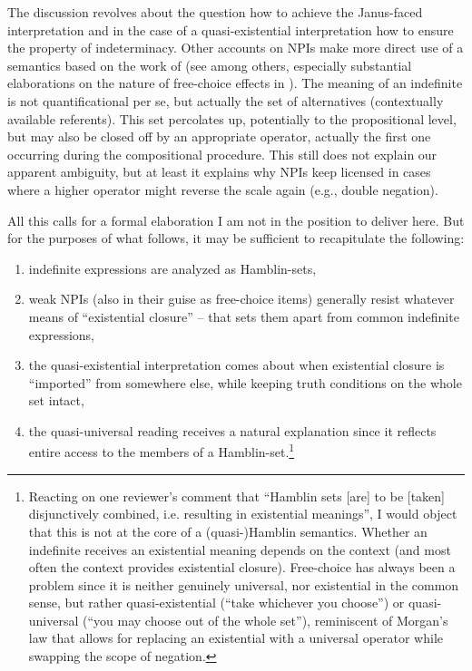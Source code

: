 \documentclass[output=paper,colorlinks,citecolor=brown,
]{langscibook}
\begin{document}
The discussion revolves about the question how to achieve the Janus-faced interpretation and in the case of a
quasi-existential interpretation how to ensure the property of indeterminacy. Other accounts on NPIs make more direct use
of a semantics based on the work of \citet{hamblin1973}
(see \citealt{ramchand1997,kratzershimo2002,kratzer2005,novelromero2009} among others, especially substantial elaborations
on the nature of free-choice effects in \citealt{fox2007,chierchia2013}). The meaning of an indefinite is
not quantificational per se, but actually the set of alternatives (contextually available referents). This set percolates up,
potentially to the propositional level, but may also be closed off by an appropriate operator, actually the first one
occurring during the compositional procedure. This still does not explain our apparent ambiguity, but at least it
explains why NPIs keep licensed in cases where a higher operator might reverse the scale again (e.g., double negation).

All this calls for a formal elaboration I am not in the position to deliver here. But for the purposes of what
follows, it may be sufficient to recapitulate the following: 

\begin{enumerate}[label=\roman*.]
\item indefinite expressions are analyzed as Hamblin-sets,
\item weak NPIs (also in their guise as free-choice items) generally resist whatever means of “existential closure” -- that sets them apart from common indefinite
expressions, 
\item the quasi-existential interpretation comes about when existential closure is “imported” from
somewhere else, while keeping truth conditions on the whole set intact,
\item the quasi-universal reading receives a natural explanation since it reflects entire access to the members of a Hamblin-set.\footnote{Reacting on one
reviewer's comment that “Hamblin sets [are] to be [taken] disjunctively combined, i.e. resulting in existential
meanings”, I would object that this is not at the core of a (quasi-)Hamblin semantics. Whether an indefinite receives
an existential meaning depends on the context (and most often the context provides existential closure). Free-choice
has always been a problem since it is neither genuinely universal, nor existential in the common sense, but rather
quasi-existential (``take whichever you choose'') or quasi-universal (``you may choose out of the whole set''),
reminiscent of Morgan's law that allows for replacing an existential with a universal operator while swapping the scope
of negation.}
\end{enumerate}
\end{document}
